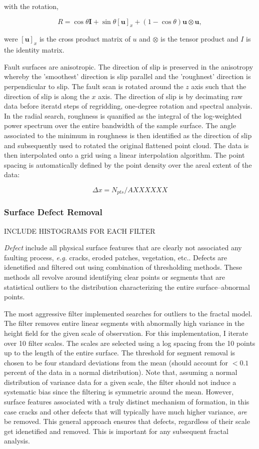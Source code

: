 \documentclass[12pt,a4paper]{article}
\begin{document}
with the rotation,

$$ R = \cos\theta\textbf{I} + \sin\theta[\textbf{u}]_x+(1-\cos\theta)\textbf{u}\otimes\textbf{u},$$

were $[\textbf{u}]_x$ is the cross product matrix of $u$ and $\otimes$ is the tensor product and $I$ is the identity matrix.

Fault surfaces are anisotropic. The direction of slip is preserved in the anisotropy whereby the 'smoothest' direction is slip parallel and the 'roughnest' direction is perpendicular to slip. The fault scan is rotated around the $z$ axis such that the direction of slip is along the $x$ axis. The direction of slip is by decimating raw data before iteratd steps of regridding, one-degree rotation and spectral analysis. In the radial search, roughness is quanified as the integral of the log-weighted power spectrum over the entire bandwidth of the sample surface. The angle associated to the minimum in roughness is then identified as the direction of slip and subsequently used to rotated the original flattened point cloud. The data is then interpolated onto a grid using a linear interpolation algorithm. The point spacing is automatically defined by the point density over the areal extent of the data:

\begin{equation}
	\Delta x = N_{pts}/A XXXXXX
\end{equation}

		\subsubsection{Surface Defect Removal} 

INCLUDE HISTOGRAMS FOR EACH FILTER


\textit{Defect} include all physical surface features that are clearly not associated any faulting process, \textit{e.g.} cracks, eroded patches, vegetation, etc.. Defects are idenetified and filtered out using combination of thresholding methods. These methods all revolve around identifying clear points or segments that are statistical outliers to the distribution characterizing the entire surface--abnormal points. 

The most aggressive filter implemented searches for outliers to the fractal model. The filter removes entire linear segments with abnormally high variance in the height field for the given scale of observation. For this implementation, I iterate over 10 filter scales. The scales are selected using a log spacing from the 10 points up to the length of the entire surface. The threshold for segment removal is chosen to be four standard deviations from the mean (should account for $<0.1$ percent of the data in a normal distribution). Note that, assuming a normal distribution of variance data for a given scale, the filter should not induce a systematic bias since the filtering is symmetric around the mean. However, surface features associated with a truly distinct mechanism of formation, in this case cracks and other defects that will typically have much higher variance, \textit{are} be removed. This general approach ensures that defects, regardless of their scale get idenetified and removed. This is important for any subsequent fractal analysis.
\end{document}
